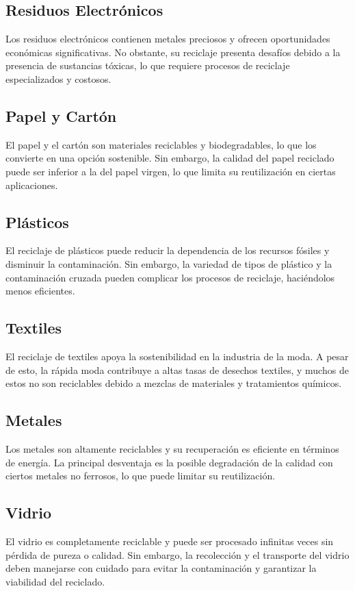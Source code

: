 \documentclass[main.tex]{subfiles}
\begin{document}
\subsection{Residuos Electrónicos}
Los residuos electrónicos contienen metales preciosos y ofrecen oportunidades económicas significativas. No obstante, su reciclaje presenta desafíos debido a la presencia de sustancias tóxicas, lo que requiere procesos de reciclaje especializados y costosos.

\subsection{Papel y Cartón}
El papel y el cartón son materiales reciclables y biodegradables, lo que los convierte en una opción sostenible. Sin embargo, la calidad del papel reciclado puede ser inferior a la del papel virgen, lo que limita su reutilización en ciertas aplicaciones.

\subsection{Plásticos}
El reciclaje de plásticos puede reducir la dependencia de los recursos fósiles y disminuir la contaminación. Sin embargo, la variedad de tipos de plástico y la contaminación cruzada pueden complicar los procesos de reciclaje, haciéndolos menos eficientes.

\subsection{Textiles}
El reciclaje de textiles apoya la sostenibilidad en la industria de la moda. A pesar de esto, la rápida moda contribuye a altas tasas de desechos textiles, y muchos de estos no son reciclables debido a mezclas de materiales y tratamientos químicos.

\subsection{Metales}
Los metales son altamente reciclables y su recuperación es eficiente en términos de energía. La principal desventaja es la posible degradación de la calidad con ciertos metales no ferrosos, lo que puede limitar su reutilización.

\subsection{Vidrio}
El vidrio es completamente reciclable y puede ser procesado infinitas veces sin pérdida de pureza o calidad. Sin embargo, la recolección y el transporte del vidrio deben manejarse con cuidado para evitar la contaminación y garantizar la viabilidad del reciclado.
\end{document}
